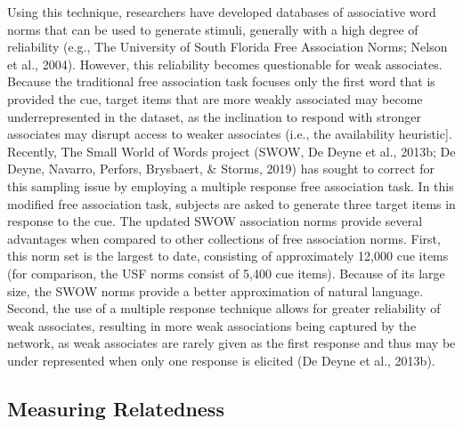 \documentclass[english,,man]{apa6}
\begin{document}
Using this technique, researchers have developed databases of associative word norms that can be used to generate stimuli, generally with a high degree of reliability (e.g., The University of South Florida Free Association Norms; Nelson et al., 2004). However, this reliability becomes questionable for weak associates. Because the traditional free association task focuses only the first word that is provided the cue, target items that are more weakly associated may become underrepresented in the dataset, as the inclination to respond with stronger associates may disrupt access to weaker associates (i.e., the availability heuristic{]}. Recently, The Small World of Words project (SWOW, De Deyne et al., 2013b; De Deyne, Navarro, Perfors, Brysbaert, \& Storms, 2019) has sought to correct for this sampling issue by employing a multiple response free association task. In this modified free association task, subjects are asked to generate three target items in response to the cue. The updated SWOW association norms provide several advantages when compared to other collections of free association norms. First, this norm set is the largest to date, consisting of approximately 12,000 cue items (for comparison, the USF norms consist of 5,400 cue items). Because of its large size, the SWOW norms provide a better approximation of natural language. Second, the use of a multiple response technique allows for greater reliability of weak associates, resulting in more weak associations being captured by the network, as weak associates are rarely given as the first response and thus may be under represented when only one response is elicited (De Deyne et al., 2013b).

\hypertarget{measuring-relatedness}{%
\subsection{Measuring Relatedness}\label{measuring-relatedness}}
\end{document}
